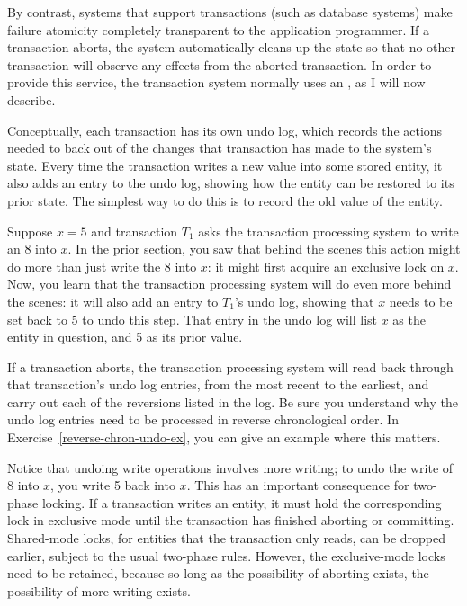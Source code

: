 By contrast, systems that support transactions (such as database
systems) make failure atomicity completely transparent to the
application programmer.  If a transaction aborts, the system
automatically cleans up the state so that no other transaction will
observe any effects from the aborted transaction.  In order to provide
this service, the transaction system normally uses an
, as I will now describe.

Conceptually, each transaction has its own undo log, which records the
actions needed to back out of the changes that transaction has made to
the system's state.  Every time the transaction writes a new value
into some stored entity, it also adds an entry to the undo log,
showing how the entity can be restored to its prior state.  The
simplest way to do this is to record the old value of the
entity.

Suppose $x=5$ and transaction $T_1$ asks the
transaction processing system to write an $8$ into $x$.  In the prior section, you saw
that behind the scenes this action might do more than just write the
8 into $x$: it might first acquire an exclusive lock on $x$.  Now, you
learn that the transaction processing system will do even more behind
the scenes: it will also add an entry to $T_1$'s undo log, showing
that $x$ needs to be set back to 5 to undo this step.  That entry in
the undo log will list $x$ as the entity in question, and 5 as its
prior value.

If a transaction aborts, the transaction processing system will read
back through that transaction's undo log entries, from the most recent
to the earliest, and carry out each of the reversions listed in the
log.  Be sure you understand why the undo log entries need to be
processed in reverse chronological order.  In Exercise~\ref{reverse-chron-undo-ex}, you can
give an example where this matters.

Notice that undoing write operations involves more writing; to undo the write of
8 into $x$, you write 5 back into $x$. This has an important
consequence for two-phase locking.  If a transaction writes an entity,
it must hold the corresponding lock in exclusive mode until the
transaction has finished aborting or committing.  Shared-mode locks,
for entities that the transaction only reads, can be dropped earlier,
subject to the usual two-phase rules.  However, the exclusive-mode locks
need to be retained, because so long as the possibility of aborting
exists, the possibility of more writing exists.

